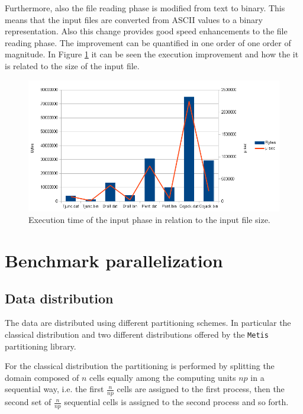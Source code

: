 \documentclass[12pt, a4paper]{article}
\begin{document}
Furthermore, also the file reading phase is modified from text to binary. This 
means that the input files are converted from ASCII values to a binary 
representation.
Also this change provides good speed enhancements to the file reading phase. 
The improvement can be quantified in one order of one order of magnitude. In
Figure \ref{fig:io} it can be seen the execution improvement and how the
it is related to the size of the input file.
\begin{figure}[h]
  \begin{centering}
    \includegraphics[width=1\textwidth]{figures/io.png}
    \par\end{centering}
  \caption{
    Execution time of the input phase in relation to the input file size. 
    \label{fig:io}
  }
\end{figure}

\clearpage

\section{Benchmark parallelization}

  \subsection*{Data distribution}
  The data are distributed using different partitioning schemes.
  In particular the classical distribution and two different distributions
  offered by the \verb=Metis= partitioning library.

  For the classical distribution the partitioning is performed by splitting the
  domain composed of $n$ cells equally among the computing units $np$ in a
  sequential way, i.e. the first $ \frac{n}{np} $ cells are assigned to the
  first process, then the second set of $ \frac{n}{np} $ sequential cells is
  assigned to the second process and so forth.
\end{document}
